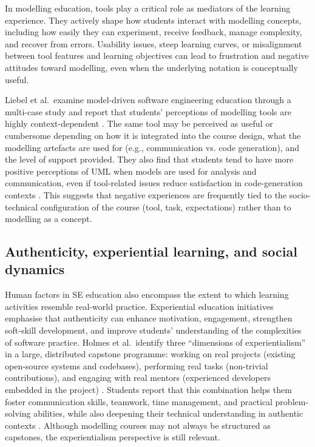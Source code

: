 In modelling education, tools play a critical role as mediators of the learning experience. They actively shape how students interact with modelling concepts, including how easily they can experiment, receive feedback, manage complexity, and recover from errors. Usability issues, steep learning curves, or misalignment between tool features and learning objectives can lead to frustration and negative attitudes toward modelling, even when the underlying notation is conceptually useful.

Liebel et al.\ examine model-driven software engineering education through a multi-case study and report that students' perceptions of modelling tools are highly context-dependent \cite{liebel2017model}. The same tool may be perceived as useful or cumbersome depending on how it is integrated into the course design, what the modelling artefacts are used for (e.g., communication vs. code generation), and the level of support provided. They also find that students tend to have more positive perceptions of UML when models are used for analysis and communication, even if tool-related issues reduce satisfaction in code-generation contexts \cite{liebel2017model}. This suggests that negative experiences are frequently tied to the socio-technical configuration of the course (tool, task, expectations) rather than to modelling as a concept.

\subsection{Authenticity, experiential learning, and social dynamics}
\label{subsec:hf_authenticity_experiential}

Human factors in SE education also encompass the extent to which learning activities resemble real-world practice. Experiential education initiatives emphasise that authenticity can enhance motivation, engagement, strengthen soft-skill development, and improve students' understanding of the complexities of software practice. Holmes et al.\ identify three ``dimensions of experientialism'' in a large, distributed capstone programme: working on real projects (existing open-source systems and codebases), performing real tasks (non-trivial contributions), and engaging with real mentors (experienced developers embedded in the project) \cite{holmes2018dimensions}. Students report that this combination helps them foster communication skills, teamwork, time management, and practical problem-solving abilities, while also deepening their technical understanding in authentic contexts \cite{holmes2018dimensions}. Although modelling courses may not always be structured as capstones, the experientialism perspective is still relevant.

